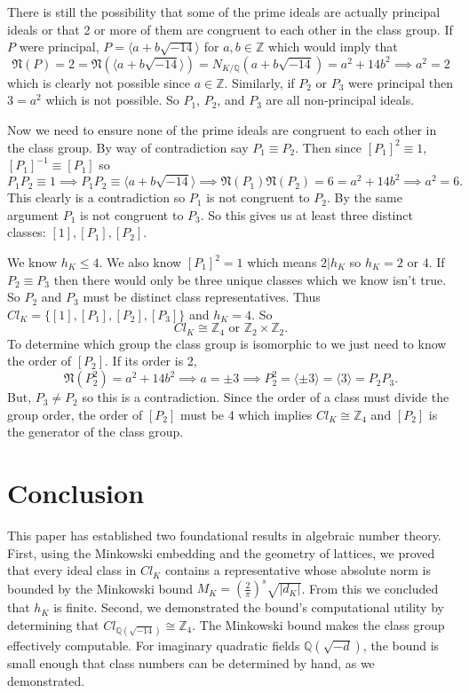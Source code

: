 \documentclass[12pt]{article}
\theoremstyle{definition}
\begin{document}
There is still the possibility that some of the prime ideals are actually principal ideals or that 2 or more of them are congruent to each other in the class group.
If $P$ were principal, $P = \langle a+b\sqrt{-14} \rangle$ for $a,b \in \mathbb{Z}$ which would imply that
\[\mathfrak{N}(P) = 2 = \mathfrak{N}(\langle a+b\sqrt{-14}\rangle) = N_{K/\mathbb{Q}}(a+b\sqrt{-14}) = a^2 + 14b^2 \implies a^2 = 2 \]
which is clearly not possible since $a \in \mathbb{Z}$. Similarly, if $P_2$ or $P_3$ were principal then $3 = a^2$ which is not possible. So
$P_1$, $P_2$, and $P_3$ are all non-principal ideals. 

Now we need to ensure none of the prime ideals are congruent to each other in the class group. By way of contradiction say $P_1 \equiv P_2$. Then since $[P_1]^2 \equiv 1$,
$[P_1]^{-1} \equiv [P_1]$ so
\[P_1P_2 \equiv 1 \implies P_1P_2 \equiv \langle a+b\sqrt{-14} \rangle \implies \mathfrak{N}(P_1) \mathfrak{N}(P_2) = 6 = a^2+14b^2 \implies a^2 = 6.\]
This clearly is a contradiction so $P_1$ is not congruent to $P_2$. By the same argument $P_1$ is not congruent to $P_3$. So this gives us at least
three distinct classes: $[1], [P_1], [P_2]$.

We know $h_K \leq 4$. We also know $[P_1]^2 = 1$ which means $2 | h_K$ so $h_K = 2 \text{ or } 4$. If $P_2 \equiv P_3$ then there would only be three unique
classes which we know isn't true. So $P_2$ and $P_3$ must be distinct class representatives. Thus $Cl_K = \{[1], [P_1], [P_2], [P_3]\}$ and $h_K = 4$. So
\[Cl_K \cong \mathbb{Z}_4 \text{ or } \mathbb{Z}_2 \times \mathbb{Z}_2.\]
To determine which group the class group is isomorphic to we just need to know the order of $[P_2]$. If its order is 2,
\[\mathfrak{N}(P_2^2) = a^2 + 14b^2 \implies a = \pm 3 \implies P_2^2 = \langle \pm 3 \rangle = \langle 3 \rangle = P_2P_3.\]
But, $P_3 \neq P_2$ so this is a contradiction. Since the order of a class must divide the group order, the order of $[P_2]$ must be 4 which implies
$Cl_K \cong \mathbb{Z}_4$ and $[P_2]$ is the generator of the class group.

\section{Conclusion}
\label{sec:conclusion}

This paper has established two foundational results in algebraic number theory. First, using the 
Minkowski embedding and the geometry of lattices, we proved that every ideal class in $Cl_K$ 
contains a representative whose absolute norm is bounded by the Minkowski bound 
$M_K = \left(\frac{2}{\pi}\right)^s \sqrt{|d_K|}$. From this we concluded that $h_K$ is finite. 
Second, we demonstrated the bound's computational utility by determining that 
$Cl_{\mathbb{Q}(\sqrt{-14})} \cong \mathbb{Z}_4$. The Minkowski bound makes the class group effectively computable. 
For imaginary quadratic fields $\mathbb{Q}(\sqrt{-d})$, the bound is small enough that class numbers can be determined 
by hand, as we demonstrated. 


\end{document}
